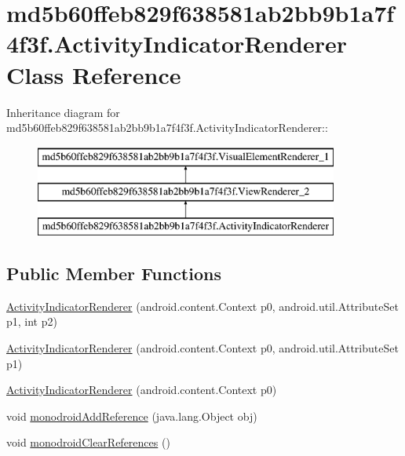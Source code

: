\hypertarget{classmd5b60ffeb829f638581ab2bb9b1a7f4f3f_1_1_activity_indicator_renderer}{
\section{md5b60ffeb829f638581ab2bb9b1a7f4f3f.ActivityIndicatorRenderer Class Reference}
\label{classmd5b60ffeb829f638581ab2bb9b1a7f4f3f_1_1_activity_indicator_renderer}
}
Inheritance diagram for md5b60ffeb829f638581ab2bb9b1a7f4f3f.ActivityIndicatorRenderer::\begin{figure}[H]
\begin{center}
\leavevmode
\includegraphics[height=3cm]{classmd5b60ffeb829f638581ab2bb9b1a7f4f3f_1_1_activity_indicator_renderer}
\end{center}
\end{figure}
\subsection*{Public Member Functions}
\begin{CompactItemize}
\item 
\hyperlink{classmd5b60ffeb829f638581ab2bb9b1a7f4f3f_1_1_activity_indicator_renderer_b2883ac0bdf26e5fa667b0c58010f930}{ActivityIndicatorRenderer} (android.content.Context p0, android.util.AttributeSet p1, int p2)
\item 
\hyperlink{classmd5b60ffeb829f638581ab2bb9b1a7f4f3f_1_1_activity_indicator_renderer_a9b11b5109e56ef935521245926c51e5}{ActivityIndicatorRenderer} (android.content.Context p0, android.util.AttributeSet p1)
\item 
\hyperlink{classmd5b60ffeb829f638581ab2bb9b1a7f4f3f_1_1_activity_indicator_renderer_93cc2af35d0f6c5f860f1c04d755eb3e}{ActivityIndicatorRenderer} (android.content.Context p0)
\item 
void \hyperlink{classmd5b60ffeb829f638581ab2bb9b1a7f4f3f_1_1_activity_indicator_renderer_5d56cfc2ee6e98e26f68994067dd0cf2}{monodroidAddReference} (java.lang.Object obj)
\item 
void \hyperlink{classmd5b60ffeb829f638581ab2bb9b1a7f4f3f_1_1_activity_indicator_renderer_53c663b171496cdee3e0eca02ade7e9d}{monodroidClearReferences} ()
\end{CompactItemize}
